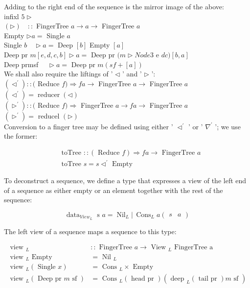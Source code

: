 \documentclass[10pt]{article}
\begin{document}
Adding to the right end of the sequence is the mirror image of the above:\\
infixl $5 \triangleright$\\
$(\triangleright) \quad::$ FingerTree $a \rightarrow a \rightarrow$ FingerTree $a$\\
Empty $\triangleright a=$ Single $a$\\
Single $b \quad \triangleright a=$ Deep $[b]$ Empty $[a]$\\
Deep pr $m[e, d, c, b] \triangleright a=$ Deep pr $(m \triangleright N o d e 3$ e $d c)[b, a]$\\
Deep prmsf $\quad \triangleright a=$ Deep pr $m(s f+[a])$\\
We shall also require the liftings of ' $\triangleleft$ ' and ' $\triangleright$ ':\\
$\left(\triangleleft^{\prime}\right)::($ Reduce $f) \Rightarrow f a \rightarrow$ FingerTree $a \rightarrow$ FingerTree $a$\\
$\left(\triangleleft^{\prime}\right)=\operatorname{reducer}(\triangleleft)$\\
$\left(\triangleright^{\prime}\right)::($ Reduce $f) \Rightarrow$ FingerTree $a \rightarrow f a \rightarrow$ FingerTree $a$\\
$\left(\triangleright^{\prime}\right)=$ reducel $(\triangleright)$\\
Conversion to a finger tree may be defined using either ' $\triangleleft^{\prime}$ ' or ' $\nabla^{\prime}$ '; we use the former:

$$
\begin{aligned}
& \text { toTree }::(\text { Reduce } f) \Rightarrow f a \rightarrow \text { FingerTree } a \\
& \text { toTree } s=s \triangleleft^{\prime} \text { Empty }
\end{aligned}
$$

To deconstruct a sequence, we define a type that expresses a view of the left end of a sequence as either empty or an element together with the rest of the sequence:

$$
\operatorname{data}_{V i e w_{L}} \text { s } a=\operatorname{Nil}_{L} \left\lvert\, \operatorname{Cons}_{L} a\left(\begin{array}{ll}
s & a
\end{array}\right)\right.
$$

The left view of a sequence maps a sequence to this type:

$$
\begin{array}{ll}
\text { view }_{L} & :: \text { FingerTree } a \rightarrow \text { View }_{L} \text { FingerTree a } \\
\text { view }_{L} \text { Empty } & =\text { Nil }_{L} \\
\text { view }_{L}(\text { Single } x) & =\text { Cons }_{L} \times \text { Empty } \\
\text { view }_{L}(\text { Deep pr } m \text { sf }) & =\text { Cons }_{L}(\text { head pr })\left(\text { deep }_{L}(\text { tail pr }) m \text { sf }\right)
\end{array}
$$
\end{document}
